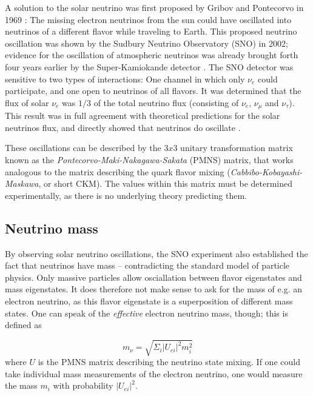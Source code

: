 \documentclass[
    a4paper, %
    fontsize=10pt, %
    twoside=false, %
    numbers=noenddot, %
    fontmethod=tex,
]{kaobook}
\begin{document}
A solution to the solar neutrino was first proposed by Gribov and Pontecorvo in 1969 : The missing electron neutrinos from the sun could have oscillated into neutrinos of a different flavor while traveling to Earth. This proposed neutrino oscillation was shown by the Sudbury Neutrino Observatory (SNO) in 2002; evidence for the oscillation of atmospheric neutrinos was already brought forth four years earlier by the Super-Kamiokande detector . The SNO detector was sensitive to two types of interactions: One channel in which only $\nu_e$ could participate, and one open to neutrinos of all flavors. It was determined that the flux of solar $\nu_e$  was $1/3$ of the total neutrino flux (consisting of $\nu_e$, $\nu_\mu$ and $\nu_\tau$). This result was in full agreement with theoretical predictions for the solar neutrinos flux, and directly showed that neutrinos do oscillate .

These oscillations can be described by the $3x3$ unitary transformation matrix known as the \textit{Pontecorvo-Maki-Nakagawa-Sakata} (PMNS) matrix, that works analogous to the matrix describing the quark flavor mixing (\textit{Cabbibo-Kobayashi-Maskawa}, or short CKM). The values within this matrix must be determined experimentally, as there is no underlying theory predicting them.

\subsection{Neutrino mass}
By observing solar neutrino oscillations, the SNO experiment also established the fact that neutrinos have mass -- contradicting the standard model of particle physics. Only massive particles allow osciallation between flavor eigenstates and mass eigenstates. It does therefore not make sense to ask for the mass of e.g. an electron neutrino, as this flavor eigenstate is a superposition of different mass states. One can speak of the \textit{effective} electron neutrino mass, though; this is defined as

\begin{equation}
m_\nu = \sqrt{ \Sigma_i |U_{ei}|^2 m_i^2 }
\end{equation}
where $U$ is the PMNS matrix describing the neutrino state mixing. If one could take individual mass measurements of the electron neutrino, one would measure the mass $m_i$ with probability $|U_{ei}|^2$.
\end{document}
